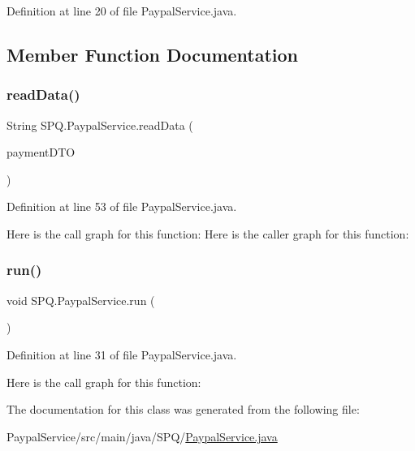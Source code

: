 Definition at line 20 of file Paypal\+Service.\+java.



\subsection{Member Function Documentation}
\mbox{\label{class_s_p_q_1_1_paypal_service_aae478af6069bf1ffa928b09f2a91328d}} 
\subsubsection{\texorpdfstring{read\+Data()}{readData()}}
{\footnotesize\ttfamily String S\+P\+Q.\+Paypal\+Service.\+read\+Data (\begin{DoxyParamCaption}\item[{\mbox{\hyperlink{class_s_p_q_1_1dto_1_1_payment_d_t_o}{Payment\+D\+TO}}}]{payment\+D\+TO }\end{DoxyParamCaption})}



Definition at line 53 of file Paypal\+Service.\+java.

Here is the call graph for this function\+:
Here is the caller graph for this function\+:
\mbox{\label{class_s_p_q_1_1_paypal_service_a05e65efee1bcfa26a215ea48b7c8696a}} 
\subsubsection{\texorpdfstring{run()}{run()}}
{\footnotesize\ttfamily void S\+P\+Q.\+Paypal\+Service.\+run (\begin{DoxyParamCaption}{ }\end{DoxyParamCaption})}



Definition at line 31 of file Paypal\+Service.\+java.

Here is the call graph for this function\+:


The documentation for this class was generated from the following file\+:\begin{DoxyCompactItemize}
\item 
Paypal\+Service/src/main/java/\+S\+P\+Q/\mbox{\hyperlink{_paypal_service_8java}{Paypal\+Service.\+java}}\end{DoxyCompactItemize}
